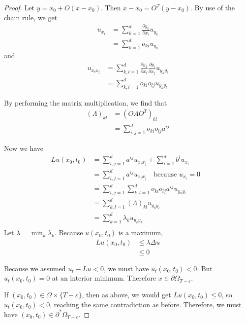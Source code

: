 \documentclass[a4paper]{article}
\begin{document}
\begin{enumerate}
\begin{proof}
      Let $y = x_0 + O(x - x_0)$. Then $x-x_0 = O^T(y-x_0)$. By use of the chain rule, we get
      \begin{align*}
        u_{x_i} &= \sum_{k=1}^d \frac{\partial y_k}{\partial x_i} u_{y_k} \\
        &= \sum_{k=1}^d o_{ki} u_{y_k}
     \end{align*}
     and
     \begin{align*}
       u_{x_i x_j} &= \sum_{k,l=1}^d \frac{\partial y_k}{\partial x_i} \frac{\partial y_l}{\partial x_j} u_{y_k y_l} \\
       &= \sum_{k,l=1}^d o_{ki} o_{lj} u_{y_k y_l}
     \end{align*}

     By performing the matrix multiplication, we find that
     \begin{align*}
       (\Lambda)_{kl} &= (OAO^T)_{kl} \\
       &= \sum_{i,j=1}^d o_{ki} o_{lj} a^{ij}
     \end{align*}

     Now we have
     \begin{align*}
       Lu(x_0,t_0) &= \sum_{i,j=1}^d a^{ij} u_{x_i x_j} + \sum_{i=1}^d b^i u_{x_i} \\
       &= \sum_{i,j=1}^d a^{ij} u_{x_i x_j} \quad \text{because $u_{x_i}=0$ } \\
       &= \sum_{i,j=1}^d \sum_{k,l=1}^d o_{ki} o_{lj} a^{ij} u_{y_k y_l} \\
       &= \sum_{k,l=1}^d (\Lambda)_{kl} u_{y_k y_l} \\
       &= \sum_{k=1}^d \lambda_k u_{y_k y_k} \\
     \end{align*}
    Let $\lambda = \min_{k} \lambda_k$.
    Because $u(x_0,t_0)$ is a maximum,
    \begin{align*}
      Lu(x_0,t_0) &\leq \lambda \Delta u \\
      &\leq 0
    \end{align*}

    Because we assumed $u_t - Lu < 0$, we must have $u_t(x_0, t_0) < 0$. But $u_t(x_0,t_0) = 0$ at an interior minimum. Therefore $x \in
    \partial \Omega_{T-\varepsilon}$.

    If $(x_0, t_0) \in \Omega \times \{T-\varepsilon\}$, then as above, we would get $Lu(x_0,t_0) \leq 0$, so $u_t(x_0, t_0) < 0$, reaching the same
    contradiction as before.
    Therefore, we must have $(x_0,t_0) \in \partial^\ast \Omega_{T-\varepsilon}$.


\end{proof}
\end{enumerate}
\end{document}

